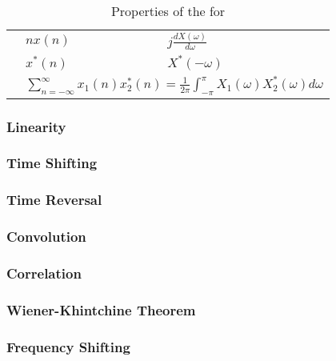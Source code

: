 \begin{table}[h!]
\begin{tabular}{lll}
    \nameref{subsubsec:FourierTransformProperties-DifferentiationFrequencyDomain} & $n x(n)$ & $j \frac{dX(\omega)}{d\omega}$ \\
    \nameref{subsubsec:FourierTransformProperties-Conjugation} & $x^{*}(n)$ & $X^{*}(-\omega)$ \\
    \nameref{subsubsec:FourierTransformProperties-ParsevalsTheorem} & \multicolumn{2}{c}{$\sum_{n=-\infty}^{\infty} x_{1}(n)x_{2}^{*}(n) = \frac{1}{2 \pi} \int_{-\pi}^{\pi}X_{1}(\omega)X_{2}^{*}(\omega) d\omega$} \\
    \bottomrule
  \end{tabular}
  \caption{Properties of the  for }
  \label{tab:FourierTransformProperties}
\end{table}

\subsubsection{Linearity}\label{subsubsec:FourierTransformProperties-Linearity}
\subsubsection{Time Shifting}\label{subsubsec:FourierTransformProperties-TimeShifting}
\subsubsection{Time Reversal}\label{subsubsec:FourierTransformProperties-TimeReversal}
\subsubsection{Convolution}\label{subsubsec:FourierTransformProperties-Convolution}
\subsubsection{Correlation}\label{subsubsec:FourierTransformProperties-Correlation}
\subsubsection{Wiener-Khintchine Theorem}\label{subsubsec:FourierTransformProperties-WienerKhintchineTheorem}
\subsubsection{Frequency Shifting}\label{subsubsec:FourierTransformProperties-FrequencyShifting}
